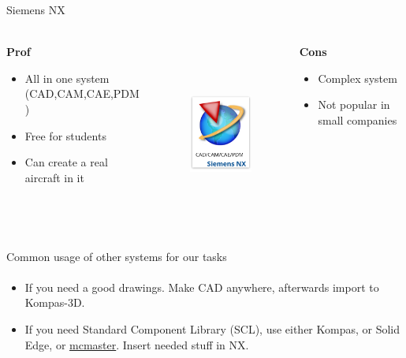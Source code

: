 \documentclass[aspectratio=169]{beamer}
\begin{document}
    \begin{frame}[t]{Siemens NX}
    \framesubtitle{}
        \begin{columns}[T,onlytextwidth]
            \begin{column}{0.32\textwidth}
                \centering\textbf{Prof}
                \begin{itemize}
                    \item All in one system (CAD,CAM,CAE,PDM)
                    \item Free for students
                    \item Can create a real aircraft in it
                \end{itemize}
            \end{column}
            \begin{column}{0.32\textwidth}
                \begin{figure}[H]
                    \centering\includegraphics[height=6cm,width=1\textwidth,keepaspectratio]{resources/NXpic.png}
                    \label{fig:resources/NXpic.png}
                \end{figure}
            \end{column}
            \begin{column}{0.32\textwidth}
                \centering\textbf{Cons}
                \begin{itemize}
                    \item Complex system
                    \item Not popular in small companies
                \end{itemize}
            \end{column}
        \end{columns}
    \end{frame}
    
    \begin{frame}[t]{Common usage of other systems for our tasks}
    \framesubtitle{}
        \begin{itemize}
            \item If you need a good drawings. Make CAD anywhere, afterwards import to Kompas-3D.
            \item If you need Standard Component Library (SCL), use either Kompas, or Solid Edge, or \href{https://www.mcmaster.com/}{mcmaster}. Insert needed stuff in NX.
        \end{itemize}
    \end{frame}
\end{document}
